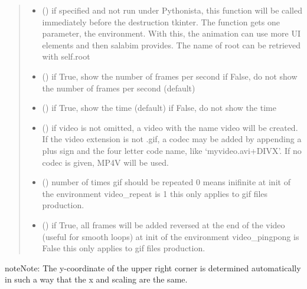 \documentclass[letterpaper,10pt,english]{sphinxmanual}
\begin{document}
\begin{fulllineitems}
\begin{fulllineitems}
\begin{quote}
\begin{description}
\begin{itemize}
\item {} 
 (\sphinxstyleliteralemphasis{ (}\sphinxstyleliteralemphasis{)}) \textendash{} if specified and not run under Pythonista, this function will be called immediately
before the destruction tkinter. The function gets one parameter, the environment. 
With this, the animation can use more UI elements and then salabim provides. 
The name of root can be retrieved with self.root

\item {} 
 () \textendash{} if True, show the number of frames per second 
if False, do not show the number of frames per second (default)

\item {} 
 () \textendash{} if True, show the time (default)  
if False, do not show the time

\item {} 
 () \textendash{} if video is not omitted, a video with the name video
will be created. 
If the video extension is not .gif, a codec may be added
by appending a plus sign and the four letter code name,
like ‘myvideo.avi+DIVX’.
If no codec is given, MP4V will be used.

\item {} 
 () \textendash{} number of times gif should be repeated 
0 means inifinite 
at init of the environment video\_repeat is 1 
this only applies to gif files production.

\item {} 
 () \textendash{} if True, all frames will be added reversed at the end of the video (useful for smooth loops)
at init of the environment video\_pingpong is False 
this only applies to gif files production.

\end{itemize}

\end{description}\end{quote}

\begin{sphinxadmonition}{note}{Note:}
The y-coordinate of the upper right corner is determined automatically
in such a way that the x and scaling are the same. 
\end{sphinxadmonition}


\end{fulllineitems}
\end{fulllineitems}
\end{document}
